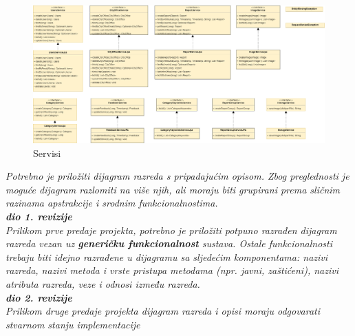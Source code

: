			\begin{figure}[H]
				\includegraphics[width=\textwidth]{slike/service.png} %
				\caption{Servisi}
				\label{fig:service} %
			\end{figure}
		
		
		
		
			\textit{Potrebno je priložiti dijagram razreda s pripadajućim opisom. Zbog preglednosti je moguće dijagram razlomiti na više njih, ali moraju biti grupirani prema sličnim razinama apstrakcije i srodnim funkcionalnostima.}\\
			
			\textbf{\textit{dio 1. revizije}}\\
			
			\textit{Prilikom prve predaje projekta, potrebno je priložiti potpuno razrađen dijagram razreda vezan uz \textbf{generičku funkcionalnost} sustava. Ostale funkcionalnosti trebaju biti idejno razrađene u dijagramu sa sljedećim komponentama: nazivi razreda, nazivi metoda i vrste pristupa metodama (npr. javni, zaštićeni), nazivi atributa razreda, veze i odnosi između razreda.}\\
			
			\textbf{\textit{dio 2. revizije}}\\			
			
			\textit{Prilikom druge predaje projekta dijagram razreda i opisi moraju odgovarati stvarnom stanju implementacije}
			
			
			\eject
			